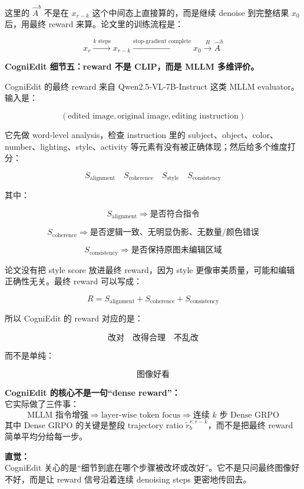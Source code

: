 这里的 $\hat{A}^{b}$ 不是在 $x_{r-k}$ 这个中间态上直接算的，而是继续 denoise 到完整结果 $x_0$ 后，用最终 reward 来算。论文里的训练流程是：

\[
x_r
\xrightarrow{k\text{ steps}}
x_{r-k}
\xrightarrow{\text{stop-gradient complete}}
x_0
\xrightarrow{R}
\hat{A}^{b}
\]

\textbf{CogniEdit 细节五：reward 不是 CLIP，而是 MLLM 多维评价。}

CogniEdit 的最终 reward 来自 Qwen2.5-VL-7B-Instruct 这类 MLLM evaluator。输入是：

\[
(\text{edited image},\text{original image},\text{editing instruction})
\]

它先做 word-level analysis，检查 instruction 里的 subject、object、color、number、lighting、style、activity 等元素有没有被正确体现；然后给多个维度打分：

\[
S_\text{alignment}
\quad
S_\text{coherence}
\quad
S_\text{style}
\quad
S_\text{consistency}
\]

其中：

\[
S_\text{alignment}
\Rightarrow
\text{是否符合指令}
\]

\[
S_\text{coherence}
\Rightarrow
\text{是否逻辑一致、无明显伪影、无数量/颜色错误}
\]

\[
S_\text{consistency}
\Rightarrow
\text{是否保持原图未编辑区域}
\]

论文没有把 style score 放进最终 reward，因为 style 更像审美质量，可能和编辑正确性无关。最终 reward 可以写成：

\[
R
=
S_\text{alignment}
+
S_\text{coherence}
+
S_\text{consistency}
\]

所以 CogniEdit 的 reward 对应的是：

\[
\text{改对}
\quad
\text{改得合理}
\quad
\text{不乱改}
\]

而不是单纯：

\[
\text{图像好看}
\]

\begin{summarybox}
\textbf{CogniEdit 的核心不是一句“dense reward”：}\\
它实际做了三件事：
\[
\text{MLLM 指令增强}
\Rightarrow
\text{layer-wise token focus}
\Rightarrow
\text{连续 } k \text{ 步 Dense GRPO}
\]
其中 Dense GRPO 的关键是整段 trajectory ratio $\tilde{r}_b^{r:r-k}$，而不是把最终 reward 简单平均分给每一步。
\end{summarybox}

\begin{intubox}
\textbf{直觉：}\\
CogniEdit 关心的是“细节到底在哪个步骤被改坏或改好”。它不是只问最终图像好不好，而是让 reward 信号沿着连续 denoising steps 更密地传回去。
\end{intubox}

